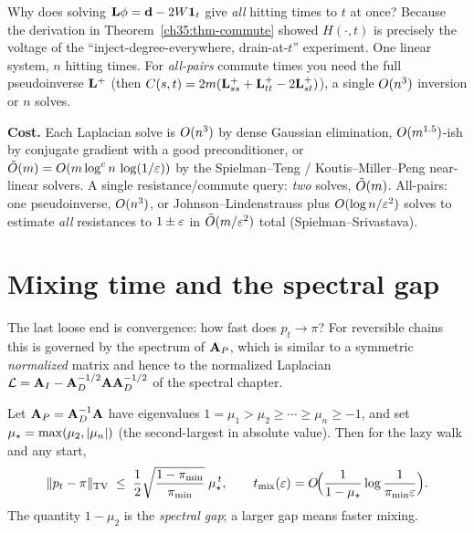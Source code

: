 \begin{whybox}
Why does solving $\mathbf{L}\phi=\mathbf{d}-2W\mathbf{1}_t$ give \emph{all} hitting times to $t$ at once? Because the derivation in Theorem~\ref{ch35:thm-commute} showed $H(\cdot,t)$ is precisely the voltage of the ``inject-degree-everywhere, drain-at-$t$'' experiment. One linear system, $n$ hitting times. For \emph{all-pairs} commute times you need the full pseudoinverse $\mathbf{L}^+$ (then $C(s,t)=2m(\mathbf{L}^+_{ss}+\mathbf{L}^+_{tt}-2\mathbf{L}^+_{st})$), a single $O(n^3)$ inversion or $n$ solves.
\end{whybox}

\begin{complexitybox}
\textbf{Cost.} Each Laplacian solve is $O(n^3)$ by dense Gaussian elimination, $O(m^{1.5})$-ish by conjugate gradient with a good preconditioner, or $\tilde{O}(m)=O(m\log^{c}n\,\log(1/\varepsilon))$ by the Spielman--Teng / Koutis--Miller--Peng near-linear solvers. A single resistance/commute query: \emph{two} solves, $\tilde{O}(m)$. All-pairs: one pseudoinverse, $O(n^3)$, or Johnson--Lindenstrauss plus $O(\log n/\varepsilon^2)$ solves to estimate \emph{all} resistances to $1\pm\varepsilon$ in $\tilde{O}(m/\varepsilon^2)$ total (Spielman--Srivastava).
\end{complexitybox}

\section{Mixing time and the spectral gap}\label{ch35:mixing}

The last loose end is convergence: how fast does $p_t\to\pi$? For reversible chains this is governed by the spectrum of $\mathbf{A}_P$, which is similar to a symmetric \emph{normalized} matrix and hence to the normalized Laplacian $\mathcal{L}=\mathbf{A}_I-\mathbf{A}_D^{-1/2}\mathbf{A}\mathbf{A}_D^{-1/2}$ of the spectral chapter.

\begin{theorem}\label{ch35:thm-mixing}
Let $\mathbf{A}_P=\mathbf{A}_D^{-1}\mathbf{A}$ have eigenvalues $1=\mu_1>\mu_2\ge\cdots\ge\mu_n\ge-1$, and set $\mu_\star=\max(\mu_2,\lvert\mu_n\rvert)$ (the second-largest in absolute value). Then for the lazy walk and any start,
\[
  \lVert p_t-\pi\rVert_{\mathrm{TV}}\;\le\;\frac{1}{2}\sqrt{\frac{1-\pi_{\min}}{\pi_{\min}}}\;\mu_\star^{\,t},
  \qquad
  t_{\mathrm{mix}}(\varepsilon)=O\!\Big(\frac{1}{1-\mu_\star}\log\frac{1}{\pi_{\min}\varepsilon}\Big).
\]
The quantity $1-\mu_2$ is the \emph{spectral gap}; a larger gap means faster mixing.
\end{theorem}

